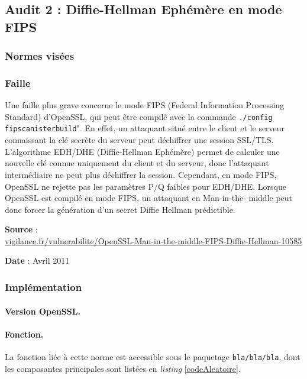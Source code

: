 		
	\subsection{Audit 2 : Diffie-Hellman Ephémère en mode FIPS}
		\subsubsection{Normes visées}

	
		\subsubsection{Faille}
	
		Une faille plus grave concerne le mode FIPS (Federal Information 
		Processing Standard) d'OpenSSL, qui peut être compilé avec la commande \texttt{./config fipscanisterbuild}". En effet, un attaquant situé entre le client et le serveur connaissant la clé secrète du serveur peut déchiffrer une 
		session SSL/TLS. \\
	
		L'algorithme EDH/DHE (Diffie-Hellman Ephémère) permet de calculer 
		une nouvelle clé connue uniquement du client et du serveur, donc
		l'attaquant intermédiaire ne peut plus déchiffrer la session.
		Cependant, en mode FIPS, OpenSSL ne rejette pas les paramètres P/Q 
		faibles pour EDH/DHE. Lorsque OpenSSL est compilé en mode FIPS, un attaquant en Man-in-the-
		middle peut donc forcer la génération d'un secret Diffie Hellman 
		prédictible.

	\textbf{Source} : \\
	\href{http://vigilance.fr/vulnerabilite/OpenSSL-Man-in-the-middle-FIPS-Diffie-Hellman-10585}
	{vigilance.fr/vulnerabilite/OpenSSL-Man-in-the-middle-FIPS-Diffie-Hellman-10585}

	\textbf{Date} : Avril 2011	
	
		\subsubsection{Implémentation}
		
			\paragraph{Version OpenSSL.\\}
		
			\paragraph{Fonction.\\}
		La fonction liée à cette norme est accessible sous le paquetage \texttt{bla/bla/bla}, dont les composantes principales sont listées en \textit{listing} \ref{codeAleatoire}.
		
